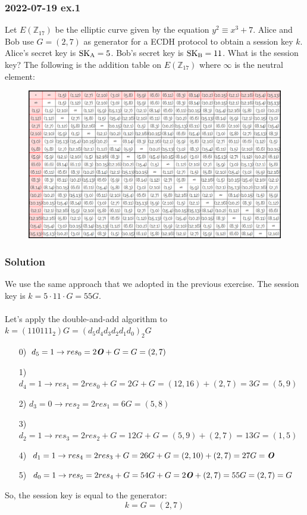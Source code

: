 \documentclass[11pt, a4paper]{article}
\begin{document}
\subsubsection{2022-07-19 ex.1}
Let $E(\mathbb{Z}_{17})$ be the elliptic curve given by the equation $y^2\equiv x^3+7$. Alice and Bob use $G=(2,7)$ as generator for a ECDH protocol to obtain a session key $k$. Alice's secret key is $\text{SK}_{\text A}=5$. Bob's secret key is $\text{SK}_{\text B}=11$. What is the session key?
The following is the addition table on $E(\mathbb{Z}_{17})$ where $\infty$ is the neutral element:
\begin{figure}[H]
    \centering
    \includegraphics[scale=0.55]{immagini/EC/2.png}
\end{figure}

\subsubsection*{Solution}
We use the same approach that we adopted in the previous exercise. The session key is $k=5\cdot11\cdot G=55G$.\\\\
Let's apply the double-and-add algorithm to $k=(110111_2)G=(d_5d_4d_3d_2d_1d_0)_2G$
\begin{enumerate}
    \item[0)] $d_5=1\rightarrow res_0=2\text{\textbf{\textit{O}}}+G=G=(2,7)$
    \item[1)] $d_4=1\rightarrow res_1=2res_0+G=2G+G=(12,16)+(2,7)=3G=(5,9)$
    \item[2)] $d_3=0\rightarrow res_2=2res_1=6G=(5,8)$
    \item[3)] $d_2=1\rightarrow res_3=2res_2+G=12G+G=(5,9)+(2,7)=13G=(1,5)$
    \item[4)] $d_1=1\rightarrow res_4=2res_3+G=26G+G=(2,10)+(2,7)=27G=\text{\textbf{\textit{O}}}$
    \item[5)] $d_0=1\rightarrow res_5=2res_4+G=54G+G=2\text{\textbf{\textit{O}}}+(2,7)=55G=(2,7)=G$
\end{enumerate}
So, the session key is equal to the generator:
$$k=G=(2,7)$$
\end{document}
